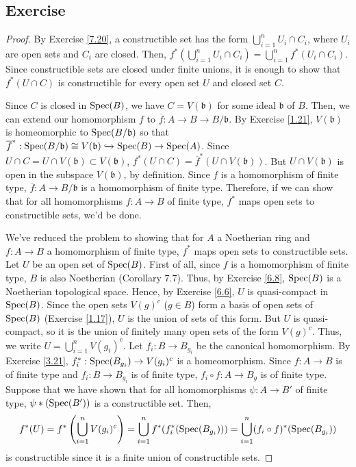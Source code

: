 \subsection{Exercise}\label{7.23}

\begin{proof}
By Exercise \ref{7.20}, a constructible set has the form $\bigcup_{i=1}^n U_i \cap C_i$, where $U_i$ are open sets and $C_i$ are closed. Then,
$f^*\left(\bigcup_{i=1}^n U_i \cap C_i\right) = \bigcup_{i=1}^n f^*(U_i \cap C_i)$. Since constructible sets are closed under finite unions, it is
enough to show that $f^*(U \cap C)$ is constructible for every open set $U$ and closed set $C$.

Since $C$ is closed in $\operatorname{Spec}(B)$, we have $C = V(\mathfrak{b})$ for some ideal $\mathfrak{b}$ of $B$. Then, we can extend our homomorphism $f$ to
$\overline{f} : A \to B \to B/\mathfrak{b}$. By Exercise \ref{1.21}, $V(\mathfrak{b})$ is homeomorphic to $\operatorname{Spec}(B/\mathfrak{b})$ so that 
$\overline{f}^* : \operatorname{Spec}(B/\mathfrak{b}) \cong V(\mathfrak{b}) \xhookrightarrow{} \operatorname{Spec}(B) \to \operatorname{Spec}(A)$. Since 
$U \cap C = U \cap V(\mathfrak{b}) \subset V(\mathfrak{b})$, $f^*(U \cap C) = \overline{f}^*(U \cap V(\mathfrak{b}))$. But $U \cap V(\mathfrak{b})$
is open in the subspace $V(\mathfrak{b})$, by definition. Since $f$ is a homomorphism of finite type, $\overline{f} : A \to B/\mathfrak{b}$ is a 
homomorphism of finite type. Therefore, if we can show that for all homomorphisms $f : A \to B$ of finite type, $f^*$ maps open sets to constructible
sets, we'd be done.

We've reduced the problem to showing that for $A$ a Noetherian ring and $f : A \to B$ a homomorphism of finite type, $f^*$ maps open sets to constructible
sets. Let $U$ be an open set of $\operatorname{Spec}(B)$. First of all, since $f$ is a homomorphism of finite type, $B$ is also Noetherian (Corollary 7.7). Thus, by
Exercise \ref{6.8}, $\operatorname{Spec}(B)$ is a Noetherian topological space. Hence, by Exercise \ref{6.6}, $U$ is quasi-compact in $\operatorname{Spec}(B)$. Since the open sets 
$V(g)^c$ ($g \in B$) form a basis of open sets of $\operatorname{Spec}(B)$ (Exercise \ref{1.17}), $U$ is the union of sets of this form. But $U$ is quasi-compact, so
it is the union of finitely many open sets of the form $V(g)^c$. Thus, we write $U = \bigcup_{i=1}^n V(g_i)^c$. Let $f_i : B \to B_{g_i}$ be the canonical
homomorphism. By Exercise \ref{3.21}, $f_i^* : \operatorname{Spec}(B_{g_i}) \to V(g_i)^c$ is a homeomorphism. Since $f : A \to B$ is of finite type and $f_i : B \to B_{g_i}$
is of finite type, $f_i \circ f : A \to B_g$ is of finite type. Suppose that we have shown that for all homomorphisms $\psi : A \to B'$ of finite type,
$\psi*(\operatorname{Spec}(B'))$ is a constructible set. Then, 
$$f^*(U) = f^*\left(\bigcup_{i=1}^n V(g_i)^c\right) = \bigcup_{i=1}^n f^*(f_i^*(\operatorname{Spec}(B_{g_i}))) = \bigcup_{i=1}^n (f_i \circ f)^*(\operatorname{Spec}(B_{g_i}))$$
is constructible since it is a finite union of constructible sets.


\end{proof}
